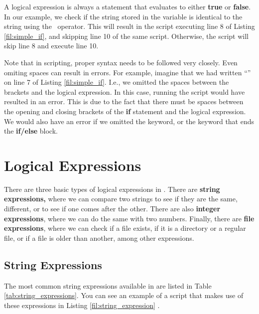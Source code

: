 A logical expression is always a statement that evaluates to either \textbf{true} or \textbf{false}. In our example, we check if the string stored in the  variable is identical to the string  using the \mycommand{==}~operator. This will result in the script executing line 8 of Listing \ref{fil:simple_if}, and skipping line 10 of the same script. Otherwise, the script will skip line 8 and execute line 10.

Note that in  scripting, proper syntax needs to be followed very closely. Even omiting spaces can result in errors. For example, imagine that we had written ``'' on line 7 of Listing \ref{fil:simple_if}. I.e., we omitted the spaces between the brackets and the logical expression. In this case, running the script would have resulted in an error. This is due to the fact that there must be spaces between the opening and closing brackets of the \textbf{if} statement and the logical expression. We would also have an error if we omitted the  keyword, or the  keyword that ends the \textbf{if/else} block.

\section{Logical Expressions}

There are three basic types of logical expressions in . There are \textbf{string expressions,} where we can compare two strings to see if they are the same, different, or to see if one comes after the other. There are also \textbf{integer expressions}, where we can do the same with two numbers. Finally, there are \textbf{file expressions}, where we can check if a file exists, if it is a directory or a regular file, or if a file is older than another, among other expressions.

\subsection{String Expressions}

The most common string expressions available in  are listed in Table \ref{tab:string_expressions}. You can see an example of a script that makes use of these expressions in Listing \ref {fil:string_expression} .

